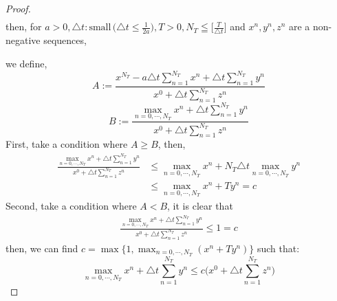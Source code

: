 \documentclass[a4paper,12pt]{article}
\begin{document}
\begin{enumerate}
\begin{proof}
\begin{equation}
\begin{aligned}
		\end{aligned}
		\end{equation}
		\newpage
		then, for $a>0,\triangle t: \text{small}\,\big( \triangle t \leq \frac{1}{2a} \big), T>0, N_T\leqq \big[ \frac{T}{\triangle t} \big]$ and $x^n, y^n, z^n$ are a non-negative sequences,
		\iffalse
		\begin{equation}\label{eq:6}
		x^{N_T} - a \triangle t \sum_{n=1}^{N_T}x^n \leq \max_{n=0,\cdots,N_T} x^n
		\end{equation}
		We will proof \eqref{eq:6} below,
		\fi
		we define,
		$$A := \frac{x^{N_T} - a \triangle t \sum_{n=1}^{N_T}x^n + \triangle t \sum_{n=1}^{N_T}y^n}{x^0 + \triangle t \sum_{n=1}^{N_T}z^n}$$
		$$B := \frac{\max_{n=0,\cdots,N_T} x^n + \triangle t \sum_{n=1}^{N_T}y^n}{x^0 + \triangle t \sum_{n=1}^{N_T}z^n}$$
		First, take a condition where $A \geq B$, then,
		\begin{align*}
		\frac{\max_{n=0,\cdots,N_T} x^n + \triangle t \sum_{n=1}^{N_T}y^n}{x^0 + \triangle t \sum_{n=1}^{N_T}z^n} &\leq \max_{n=0,\cdots,N_T} x^n + N_T \triangle t \max_{n=0,\cdots,N_T} y^n\\
		&\leq \max_{n=0,\cdots,N_T} x^n + T y^n = c
		\end{align*}
		Second, take a condition where $A < B$, it is clear that
		\begin{align*}
		\frac{\max_{n=0,\cdots,N_T} x^n + \triangle t \sum_{n=1}^{N_T}y^n}{x^0 + \triangle t \sum_{n=1}^{N_T}z^n} \leq 1 = c
		\end{align*}
		then, we can find $c=\max\{1, \max_{n=0,\cdots,N_T} (x^n + T y^n)\}$ such that:
		\begin{equation}\label{eq:6}
		\max_{n=0,\cdots,N_T} x^n + \triangle t \sum_{n=1}^{N_T}y^n \leq c\bigg(x^0 + \triangle t \sum_{n=1}^{N_T} z^n\bigg)
		\end{equation}
	\end{proof}
\end{enumerate}
\end{document}
